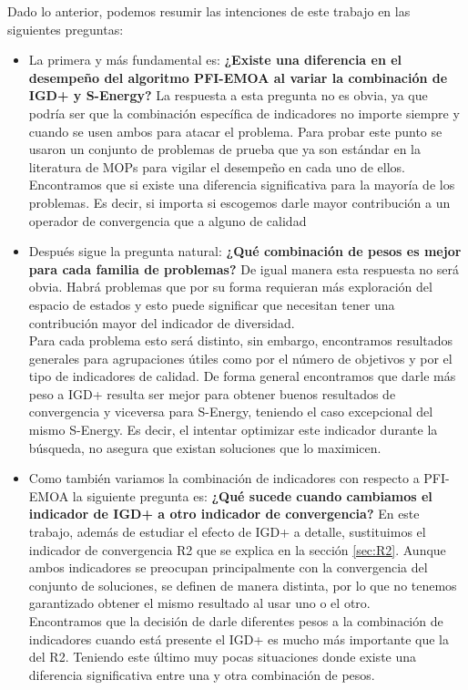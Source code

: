 Dado lo anterior, podemos resumir las intenciones de este trabajo en las siguientes preguntas:

\begin{itemize}
    \item La primera y más fundamental es: \textbf{¿Existe una diferencia en el desempeño del algoritmo PFI-EMOA al variar la combinación de IGD+ y S-Energy?}
    La respuesta a esta pregunta no es obvia, ya que podría ser que la combinación específica de indicadores no importe siempre y cuando se usen ambos para atacar el problema. Para probar este punto se usaron un conjunto de problemas de prueba que ya son estándar en la literatura de MOPs para vigilar el desempeño en cada uno de ellos. 
    \\Encontramos que si existe una diferencia significativa para la mayoría de los problemas. Es decir, si importa si escogemos darle mayor contribución a un operador de convergencia que a alguno de calidad
    \item Después sigue la pregunta natural: \textbf{¿Qué combinación de pesos es mejor para cada familia de problemas?}
    De igual manera esta respuesta no será obvia. Habrá problemas que por su forma requieran más exploración del espacio de estados y esto puede significar que necesitan tener una contribución mayor del indicador de diversidad. \\
    Para cada problema esto será distinto, sin embargo, encontramos resultados generales para agrupaciones útiles como por el número de objetivos y por el tipo de indicadores de calidad. De forma general encontramos que darle más peso a IGD+ resulta ser mejor para obtener buenos resultados de convergencia y viceversa para S-Energy, teniendo el caso excepcional del mismo S-Energy. Es decir, el intentar optimizar este indicador durante la búsqueda, no asegura que existan soluciones que lo maximicen.
    \item Como también variamos la combinación de indicadores con respecto a PFI-EMOA la siguiente pregunta es: \textbf{¿Qué sucede cuando cambiamos el indicador de IGD+ a otro indicador de convergencia?}
    En este trabajo, además de estudiar el efecto de IGD+ a detalle, sustituimos el indicador de convergencia R2 \cite{R2} que se explica en la sección \ref{sec:R2}. Aunque ambos indicadores se preocupan principalmente con la convergencia del conjunto de soluciones, se definen de manera distinta, por lo que no tenemos garantizado obtener el mismo resultado al usar uno o el otro.\\
    Encontramos que la decisión de darle diferentes pesos a la combinación de indicadores cuando está presente el IGD+ es mucho más importante que la del R2. Teniendo este último muy pocas situaciones donde existe una diferencia significativa entre una y otra combinación de pesos.
   
\end{itemize}



